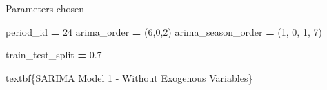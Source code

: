 \documentclass[mstat,12pt]{unswthesis}
\newenvironment{Shaded}{\begin{snugshade}}{\end{snugshade}}
\newcommand{\DecValTok}[1]{\textcolor[rgb]{0.00,0.00,0.81}{#1}}
\newcommand{\FloatTok}[1]{\textcolor[rgb]{0.00,0.00,0.81}{#1}}
\newcommand{\NormalTok}[1]{#1}
\newcommand{\OperatorTok}[1]{\textcolor[rgb]{0.81,0.36,0.00}{\textbf{#1}}}
\begin{document}
\noindent Parameters chosen

\begin{Shaded}
\begin{Highlighting}[]
\NormalTok{period\_id }\OperatorTok{=} \DecValTok{24}
\NormalTok{arima\_order }\OperatorTok{=}\NormalTok{ (}\DecValTok{6}\NormalTok{,}\DecValTok{0}\NormalTok{,}\DecValTok{2}\NormalTok{)}
\NormalTok{arima\_season\_order }\OperatorTok{=}\NormalTok{ (}\DecValTok{1}\NormalTok{, }\DecValTok{0}\NormalTok{, }\DecValTok{1}\NormalTok{, }\DecValTok{7}\NormalTok{)}

\NormalTok{train\_test\_split }\OperatorTok{=} \FloatTok{0.7}
\end{Highlighting}
\end{Shaded}

\noindent textbf\{SARIMA Model 1 - Without Exogenous Variables\}
\end{document}
